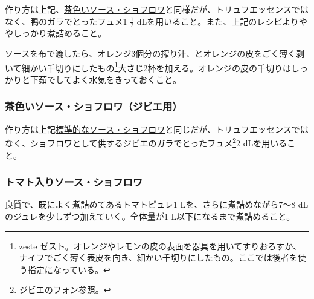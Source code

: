 \begin{recette}
作り方は上記、\protect\hyperlink{sauce-chaud-froid-brune}{茶色いソース・ショフロワ}と同様だが、トリュフエッセンスではなく、鴨のガラでとったフュメ1
\(\frac{1}{2}\)
dLを用いること。また、上記のレシピよりややしっかり煮詰めること。

ソースを布で漉したら、オレンジ3個分の搾り汁、とオレンジの皮をごく薄く剥いて細かい千切りにしたもの\footnote{zeste
  ゼスト。オレンジやレモンの皮の表面を器具を用いてすりおろすか、ナイフでごく薄く表皮を向き、細かい千切りにしたもの。ここでは後者を使う指定になっている。}大さじ2杯を加える。オレンジの皮の千切りはしっかりと下茹でしてよく水気をきっておくこと。

\hypertarget{sauce-chaud-froid-brune-pour-gibier}{%
\subsubsection{茶色いソース・ショフロワ（ジビエ用）}\label{sauce-chaud-froid-brune-pour-gibier}}



作り方は上記\protect\hyperlink{sauce-chaud-froid-brune}{標準的なソース・ショフロワ}と同じだが、トリュフエッセンスではなく、ショフロワとして供するジビエのガラでとったフュメ\footnote{\protect\hyperlink{fonds-de-gibier}{ジビエのフォン}参照。}2
dLを用いること。

\hypertarget{sauce-chaud-froid-tomatee}{%
\subsubsection{トマト入りソース・ショフロワ}\label{sauce-chaud-froid-tomatee}}



良質で、既によく煮詰めてあるトマトピュレ1 Lを、さらに煮詰めながら7〜8
dLのジュレを少しずつ加えていく。全体量が1 L以下になるまで煮詰めること。


\end{recette}
